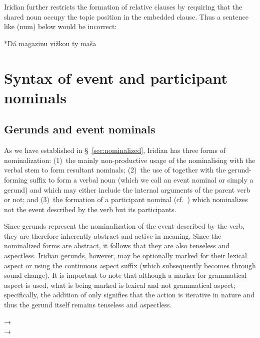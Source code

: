 Iridian further restricts the formation of relative clauses by requiring that
the shared noun occupy the topic position in the embedded clause. Thus  a
sentence like (num) below would be incorrect:

*Dá magazinu vižkou ty maša


\section{Syntax of event and participant nominals}\label{sec:nomz-syntax}

\subsection{Gerunds and event nominals}

As we have established in \S~\ref{sec:nominalized}, Iridian has three forms of
nominalization: (1)~the mainly non-productive usage of the
nominalising  with the verbal stem to form resultant nominals; (2)~the
use of  together with the gerund-forming suffix 
to form a verbal noun (which we call an event nominal or simply a gerund) and
which may either include the internal arguments of the parent verb or not; and
(3)~the formation of a participant nominal (cf.~\cite{okuna}) which nominalizes
not the event described by the verb but its participants.

Since gerunds represent the nominalization of the
event described by the verb, they are therefore inherently
abstract and active in meaning. Since the nominalized forms are abstract, it
follows that they are also tenseless and aspectless. Iridian gerunds, however,
may be optionally marked for their lexical aspect or 
 using the continuous aspect suffix 
(which subsequently becomes  through sound change). It is important to
note that although a marker for grammatical aspect is used,
what is being marked is lexical and not grammatical aspect; specifically, the
addition of  only signifies that the action is iterative in nature and
thus the gerund itself remains tenseless and aspectless.

\pex
    \a {} → \\
    \a {} → \\
\xe


